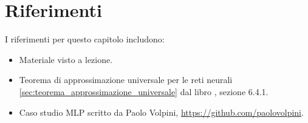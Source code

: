 \section*{Riferimenti}
I riferimenti per questo capitolo includono:
\begin{itemize}
	\item Materiale visto a lezione.
	\item Teorema di approssimazione universale per le reti neurali \ref{sec:teorema_approssimazione_universale} dal libro  \cite{Goodfellow-et-al-2016}, sezione 6.4.1.
	\item Caso studio MLP scritto da Paolo Volpini, \url{https://github.com/paolovolpini}.
\end{itemize}